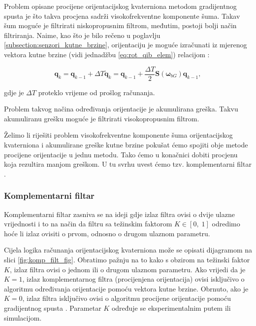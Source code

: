 \documentclass[times, utf8, diplomski, numeric]{templates/template}
\begin{document}
{{{{                Problem opisane procijene orijentacijskog kvaterniona metodom gradijentnog spusta je što takva procjena sadrži visokofrekventne komponente šuma. Takav šum moguće je filtrirati niskopropusnim filtrom, međutim, postoji bolji način filtriranja. Naime, kao što je bilo rečeno u poglavlju \ref{subsection:senzori_kutne_brzine}, orijentaciju je moguće izračunati iz mjerenog vektora kutne brzine (vidi jednadžbu \ref{eq:rot_qib_elem}) relacijom \cite{uvod_u_svemirske}:

                \begin{equation}
                    \boldsymbol{q}_k = \boldsymbol{q}_{k-1} + \Delta T \dot{\boldsymbol{q}}_k = \boldsymbol{q}_{k-1} + \frac{\Delta T}{2} \boldsymbol{S}(\boldsymbol{\omega}_{bG}) \boldsymbol{q}_{k-1},
                \end{equation}

                gdje je $\Delta T$ proteklo vrijeme od prošlog računanja.

                Problem takvog načina određivanja orijentacije je akumulirana greška. Takvu akumuliranu grešku moguće je filtrirati visokopropusnim filtrom. 

                Želimo li riješiti problem visokofrekventne komponente šuma orijentacijskog kvaterniona i akumulirane greške kutne brzine pokušat ćemo spojiti obje metode procijene orijentacije u jednu metodu. Tako ćemo u konačnici dobiti procjenu koja rezultira manjom greškom. U tu svrhu uvest ćemo tzv. komplementarni filtar \cite{uvod_u_svemirske}.
            }

            \subsubsection{Komplementarni filtar}{
                Komplementarni filtar zasniva se na ideji gdje izlaz filtra ovisi o dvije ulazne vrijednosti i to na način da filtru sa težinskim faktorom $K \in \left[ 0, \; 1\right]$ odredimo hoće li izlaz ovisiti o prvom, odnosno o drugom ulaznom parametru. 

                Cijela logika računanja orijentacijskog kvaterniona može se opisati dijagramom na slici \ref{fig:komp_filt_fig}. Obratimo pažnju na to kako s obzirom na težinski faktor $K$, izlaz filtra ovisi o jednom ili o drugom ulaznom parametru. Ako vrijedi da je $K = 1$, izlaz komplementarnog filtra (procijenjena orijentacija) ovisi isključivo o algoritmu određivanja orijentacije pomoću vektora kutne brzine. Obrnuto, ako je $K = 0$, izlaz filtra isključivo ovisi o algoritmu procijene orijentacije pomoću gradijentnog spusta \cite{grad_desc}. Parametar $K$ određuje se eksperimentalnim putem ili simulacijom. 

}}}}
\end{document}
